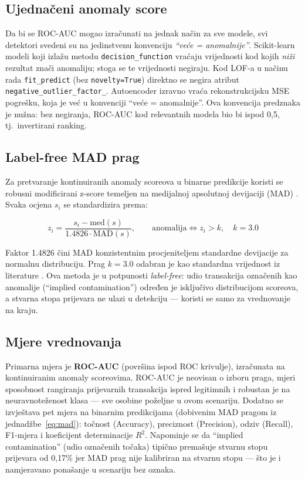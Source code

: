 \documentclass[letterpaper, 10pt, conference]{ieeeconf}
\begin{document}
\subsection{Ujednačeni anomaly score}

Da bi se ROC-AUC mogao izračunati na jednak način za sve modele, svi detektori svedeni su na jedinstvenu konvenciju \emph{``veće = anomalnije''}.
Scikit-learn modeli koji izlažu metodu \texttt{decision\_function} vraćaju vrijednosti kod kojih \emph{niži} rezultat znači anomaliju; stoga se te vrijednosti negiraju.
Kod LOF-a u načinu rada \texttt{fit\_predict} (bez \texttt{novelty=True}) direktno se negira atribut \texttt{negative\_outlier\_factor\_}.
Autoencoder izravno vraća rekonstrukcijsku MSE pogrešku, koja je već u konvenciji ``veće = anomalnije''.
Ova konvencija predznaka je nužna: bez negiranja, ROC-AUC kod relevantnih modela bio bi ispod 0,5, tj.\ invertirani ranking.

\subsection{Label-free MAD prag}

Za pretvaranje kontinuiranih anomaly scoreova u binarne predikcije koristi se robusni modificirani z-score temeljen na medijalnoj apsolutnoj devijaciji (MAD) \cite{mad}. Svaka ocjena $s_i$ se standardizira prema:

\begin{equation}
z_i = \frac{s_i - \mathrm{med}(s)}{1.4826 \cdot \mathrm{MAD}(s)}, \qquad
\text{anomalija} \iff z_i > k, \quad k = 3.0
\label{eq:mad}
\end{equation}

Faktor 1.4826 čini MAD konzistentnim procjeniteljem standardne devijacije za normalnu distribuciju. Prag $k = 3.0$ odabran je kao standardna vrijednost iz literature \cite{mad}. Ova metoda je u potpunosti \emph{label-free}: udio transakcija označenih kao anomalije (``implied contamination'') određen je isključivo distribucijom scoreova, a stvarna stopa prijevara ne ulazi u detekciju --- koristi se samo za vrednovanje na kraju.

\subsection{Mjere vrednovanja}

Primarna mjera je \textbf{ROC-AUC} (površina ispod ROC krivulje), izračunata na kontinuiranim anomaly scoreovima. ROC-AUC je neovisan o izboru praga, mjeri sposobnost rangiranja prijevarnih transakcija ispred legitimnih i robustan je na neuravnoteženost klasa --- sve osobine poželjne u ovom scenariju. Dodatno se izvještava pet mjera na binarnim predikcijama (dobivenim MAD pragom iz jednadžbe~\eqref{eq:mad}): točnost (Accuracy), preciznost (Precision), odziv (Recall), F1-mjera i koeficijent determinacije $R^2$. Napominje se da ``implied contamination'' (udio označenih točaka) tipično premašuje stvarnu stopu prijevara od 0,17\% jer MAD prag nije kalibriran na stvarnu stopu --- što je i namjeravano ponašanje u scenariju bez oznaka.
\end{document}
